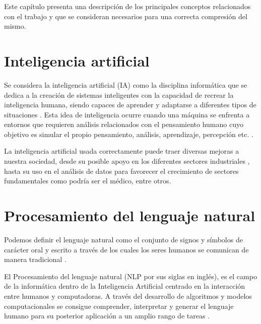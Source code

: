 Este capítulo presenta una descripción de los principales conceptos relacionados con el trabajo y que se consideran necesarios para una correcta compresión del mismo.



\section{Inteligencia artificial}
Se considera la inteligencia artificial (IA) \cite{schank1987ai} como la disciplina informática que se dedica a la creación de sistemas inteligentes con la capacidad de recrear la inteligencia humana, siendo capaces de aprender y adaptarse a diferentes tipos de situaciones \cite{wang2019defining}. Esta idea de inteligencia ocurre cuando una máquina se enfrenta a entornos que requieren análisis relacionados con el pensamiento humano cuyo objetivo es simular el propio pensamiento, análisis, aprendizaje, percepción etc. \cite{barbarossa2009inteligencia}.

La inteligencia artificial usada correctamente puede traer diversas mejoras a nuestra sociedad, desde su posible apoyo en los diferentes sectores industriales \cite{albrieu2019inteligencia}, hasta su uso en el análisis de datos para favorecer el crecimiento de sectores fundamentales como podría ser el médico, entre otros\cite{rouhiainen2018inteligencia}.


\section{Procesamiento del lenguaje natural}

Podemos definir el lenguaje natural como el conjunto de signos y símbolos de carácter oral y escrito a través de los cuales los seres humanos se comunican de manera tradicional \cite{mendez1999lenguaje}.

El Procesamiento del lenguaje natural (NLP por sus siglas en inglés), es el campo de la informática dentro de la Inteligencia Artificial centrado en la interacción entre humanos y computadoras. A través del desarrollo de algoritmos y modelos computacionales se consigue comprender, interpretar y generar el lenguaje humano para su posterior aplicación a un amplio rango de tareas \cite{nadkarni2011natural}.

